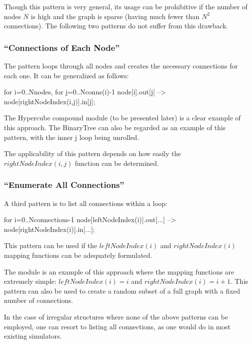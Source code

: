 Though this pattern is very general, its usage can be prohibitive if
the number of nodes $N$ is high and the graph is sparse (having
much fewer than $N^2$ connections). The following
two patterns do not suffer from this drawback.


\subsubsection{``Connections of Each Node''}
\label{sec:ned-lang:connections-of-each-node}

The pattern loops through all nodes and creates the necessary
connections for each one. It can be generalized as follows:

\begin{ned}
for i=0..Nnodes, for j=0..Nconns(i)-1 {
    node[i].out[j] --> node[rightNodeIndex(i,j)].in[j];
}
\end{ned}

The Hypercube compound module (to be
presented later) is a clear example of this approach. The BinaryTree can
also be regarded as an example of this pattern, with the inner j loop
being unrolled.

The applicability of this pattern depends on how easily the $rightNodeIndex(i,j)$
function can be determined.


\subsubsection{``Enumerate All Connections''}
\label{sec:ned-lang:enumerate-all-connections}


A third pattern is to list all connections within a loop:

\begin{ned}
for i=0..Nconnections-1 {
    node[leftNodeIndex(i)].out[...] --> node[rightNodeIndex(i)].in[...];
}
\end{ned}

This pattern can be used if the $leftNodeIndex(i)$ and $rightNodeIndex(i)$
mapping functions can be adequately formulated.

The  module is an example of this approach where the mapping
functions are extremely simple: $leftNodeIndex(i)=i$ and $rightNodeIndex(i) = i+1$.
This pattern can also be used to create a random subset of a full
graph with a fixed number of connections.

In the case of irregular structures where none of the above patterns
can be employed, one can resort to listing all connections, as one
would do in most existing simulators.



